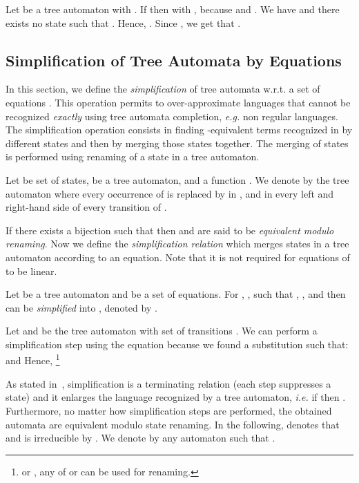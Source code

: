 \documentclass[a4paper,11pt]{llncs}
\theoremstyle{plain}
\begin{document}
\begin{example}
Let  be a tree automaton with . If  then  with , because  and . We have  and there exists no
  state  such that . Hence,
  . Since
  , we
  get that .
\end{example}


\subsection{Simplification of  Tree Automata by Equations}
\label{sec:simplif}
In this section, we define the {\em simplification} of tree automata 
w.r.t. a set of equations . This operation permits to
over-approximate languages that cannot be recognized {\em exactly} using tree
automata completion, {\em e.g.} non regular languages. The simplification operation
consists in finding -equivalent terms recognized in  by different states
and then by merging those states together. The merging of states is performed
using renaming of a state in a tree automaton.


\label{sec:merging}
\begin{definition}
  Let  be set of states,  be a
  tree automaton, and  a function . We denote by
   the tree automaton where every occurrence of  is
  replaced by  in ,  and in every left and right-hand
  side of every transition of . 
\end{definition}
If there exists a bijection  such that  then  and
 are said to be {\em equivalent modulo renaming}. 
Now we define the {\em simplification relation} which merges states in a tree
automaton according to an equation. Note that it is not required for equations
of  to be linear.

\begin{definition}
\label{def:simprel}
  Let  be a tree automaton and  be
  a set of equations. For , ,  such that , , 
 and  then  can be {\em simplified} into , denoted by
.
\end{definition}

\begin{example}
  Let  and  be the tree automaton with set of
  transitions . We can perform a simplification step using the equation
   because we found a substitution  such that:  and 
  Hence, \footnote{or ,
any of  or  can be used for renaming.}
\end{example}


\noindent
As stated in~\cite{GenetR-JSC10}, simplification
 is a terminating relation (each step suppresses a state) and it
enlarges the language recognized by a tree automaton, {\em i.e.} if 
then . Furthermore, no matter how
simplification steps are performed, the obtained automata are equivalent modulo
state renaming. In the following,  denotes that  and  is irreducible by . We denote by  any automaton  such that . 
\end{document}
